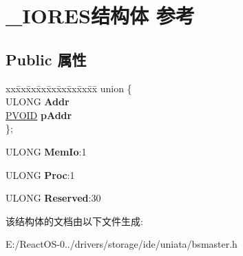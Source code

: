 \hypertarget{struct___i_o_r_e_s}{}\section{\+\_\+\+I\+O\+R\+E\+S结构体 参考}
\label{struct___i_o_r_e_s}
\subsection*{Public 属性}
\begin{DoxyCompactItemize}
\item 
\mbox{\label{struct___i_o_r_e_s_a0a40313b4ff02f64ebe3014806f64221}} 
\begin{tabbing}
xx\=xx\=xx\=xx\=xx\=xx\=xx\=xx\=xx\=\kill
union \{\\
\>ULONG {\bfseries Addr}\\
\>\hyperlink{interfacevoid}{PVOID} {\bfseries pAddr}\\
\}; \\

\end{tabbing}\item 
\mbox{\label{struct___i_o_r_e_s_a80001c67d250d5f91c9ac2dbf81d55c3}} 
U\+L\+O\+NG {\bfseries Mem\+Io}\+:1
\item 
\mbox{\label{struct___i_o_r_e_s_a0c1f143beaefc5ffbe329fe7c78c354f}} 
U\+L\+O\+NG {\bfseries Proc}\+:1
\item 
\mbox{\label{struct___i_o_r_e_s_a41bb5eba9ed172352eec6521b834e878}} 
U\+L\+O\+NG {\bfseries Reserved}\+:30
\end{DoxyCompactItemize}


该结构体的文档由以下文件生成\+:\begin{DoxyCompactItemize}
\item 
E\+:/\+React\+O\+S-\/0../drivers/storage/ide/uniata/bsmaster.\+h\end{DoxyCompactItemize}
